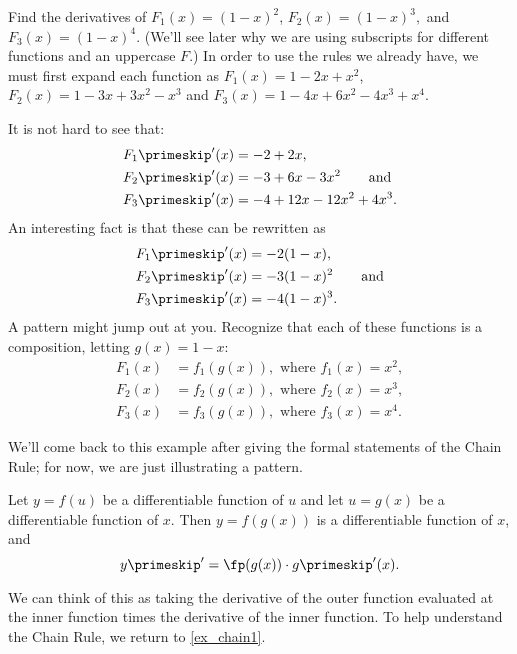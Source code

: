 \begin{example}\label{ex_chain1}%
Find the derivatives of $F_1(x) = (1-x)^2$, $F_2(x) = (1-x)^3,$ and $F_3(x) = (1-x)^4.$ (We'll see later why we are using subscripts for different functions and an uppercase $F$.)
\solution
In order to use the rules we already have, we must first expand each function as
$F_1(x) = 1 - 2x + x^2$,  $F_2(x) = 1 - 3x + 3x^2 - x^3$ and $F_3(x) = 1 - 4x + 6x^2 - 4x^3 + x^4$.
  
It is not hard to see that:
\begin{align*}
F_1\primeskip'(x) &= -2 + 2x,\\
F_2\primeskip'(x) &= -3 + 6x - 3x^2\qquad\text{and}\\
F_3\primeskip'(x) &= -4 + 12x - 12x^2 + 4x^3.
\end{align*}
An interesting fact is that these can be rewritten as
\begin{align*}
F_1\primeskip'(x) &= -2(1-x),\\
F_2\primeskip'(x) &= -3(1-x)^2\qquad\text{and} \\
F_3\primeskip'(x) &= -4(1-x)^3.
\end{align*}
A pattern might jump out at you.  Recognize that each of these functions is a composition, letting $g(x) = 1-x$:
\begin{align*}
F_1(x) &= f_1(g(x)), \text{ where } f_1(x) = x^2,\\
F_2(x) &= f_2(g(x)), \text{ where } f_2(x) = x^3,\\
F_3(x) &= f_3(g(x)), \text{ where } f_3(x) = x^4.
\end{align*}

We'll come back to this example after giving the formal statements of the Chain Rule; for now, we are just illustrating a pattern.
\end{example}

\begin{theorem}\label{thm:chain_rule}%
Let $y = f(u)$ be a differentiable function of $u$ and let $u = g(x)$ be a differentiable function of $x$. Then $y=f(g(x))$ is a differentiable function of $x$, and \[y\primeskip' = \fp(g(x))\cdot g\primeskip'(x).\]
\end{theorem}

We can think of this as taking the derivative of the outer function evaluated at the inner function times the derivative of the inner function. To help  understand the Chain Rule, we return to \autoref{ex_chain1}.


